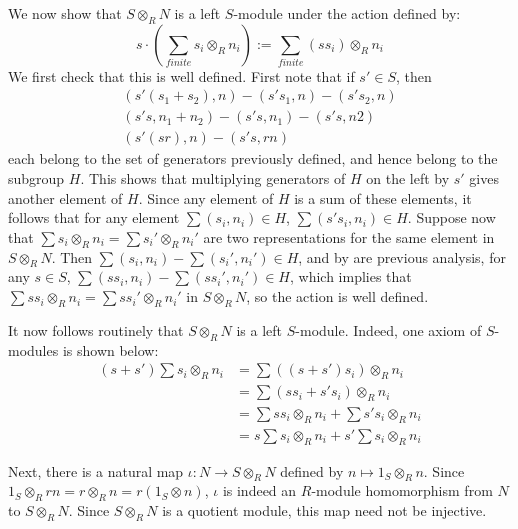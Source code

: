 \documentclass[12pt, a4paper, oneside, openright, titlepage]{book}
\begin{document}
\begin{cons}
    We now show that $S\otimes_RN$ is a left $S$-module under the action defined by: \begin{equation*}
        s\cdot\left(\sum\limits_{finite}s_i\otimes_Rn_i\right) := \sum\limits_{finite}(ss_i)\otimes_Rn_i
    \end{equation*}
    We first check that this is well defined. First note that if $s' \in S$, then \begin{equation*}
        \begin{array}{c}
            (s'(s_1+s_2),n) - (s's_1,n) - (s's_2,n) \\
            (s's,n_1+n_2) - (s's,n_1) - (s's,n2) \\
            (s'(sr),n) - (s's,rn)
        \end{array}
    \end{equation*}
    each belong to the set of generators previously defined, and hence belong to the subgroup $H$. This shows that multiplying generators of $H$ on the left by $s'$ gives another element of $H$. Since any element of $H$ is a sum of these elements, it follows that for any element $\sum(s_i,n_i) \in H$, $\sum(s's_i,n_i) \in H$. Suppose now that $\sum s_i\otimes_Rn_i = \sum s_i'\otimes_Rn_i'$ are two representations for the same element in $S\otimes_R N$. Then $\sum(s_i,n_i) - \sum(s_i',n_i') \in H$, and by are previous analysis, for any $s \in S$, $\sum(ss_i,n_i) - \sum(ss_i',n_i') \in H$, which implies that $\sum ss_i\otimes_Rn_i = \sum ss_i'\otimes_Rn_i'$ in $S\otimes_R N$, so the action is well defined.

    It now follows routinely that $S\otimes_RN$ is a left $S$-module. Indeed, one axiom of $S$-modules is shown below: \begin{align*}
        (s+s')\sum s_i\otimes_R n_i &= \sum((s+s')s_i)\otimes_Rn_i \\
        &= \sum(ss_i+s's_i)\otimes_Rn_i \\
        &= \sum ss_i\otimes_Rn_i + \sum s's_i\otimes_Rn_i \\
        &= s\sum s_i\otimes_Rn_i + s' \sum s_i\otimes_Rn_i
    \end{align*}


    Next, there is a natural map $\iota:N\rightarrow S\otimes_R N$ defined by $n\mapsto 1_S\otimes_Rn$. Since $1_S\otimes_Rrn = r\otimes_Rn = r(1_S\otimes n)$, $\iota$ is indeed an $R$-module homomorphism from $N$ to $S\otimes_RN$. Since $S\otimes_R N$ is a quotient module, this map need not be injective.
\end{cons}
\end{document}

